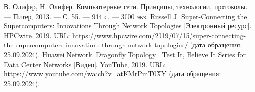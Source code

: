 \documentclass[11pt,a4paper,final]{article} %
\begin{document}
\newpage
{}

\begin{thebibliography}{99}
	 В. Олифер, Н. Олифер. Компьютерные сети. Принципы, технологии, протоколы. — Питер, 2013. — С. 55. — 944 с. — 3000 экз.
	 Russell J. Super-Connecting the Supercomputers: Innovations Through Network Topologies [Электронный ресурс]. HPCwire. 2019. URL: \url{https://www.hpcwire.com/2019/07/15/super-connecting-the-supercomputers-innovations-through-network-topologies/} (дата обращения: 25.09.2024).
	Huawei Network. Dragonfly Topology | Test It, Believe It Series for Data Center Networks [Видео]. YouTube, 2019. URL: \url{https://www.youtube.com/watch?v=atKMrPmT0XY} (дата обращения: 25.09.2024).
\end{thebibliography}

		
\end{document}
